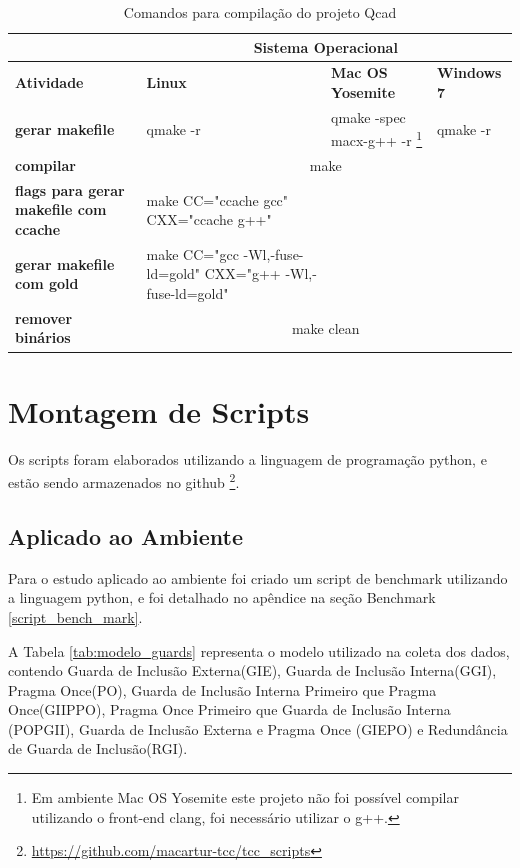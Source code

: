 \begin{itemize}
\begin{table}[h]
\begin{tabular}{p{3cm}p{5cm}p{5cm}p{5cm}}
\toprule
 & \multicolumn{3}{c}{Sistema Operacional} \\ \toprule 
\textbf{Atividade} & \textbf{Linux} & \textbf{Mac OS Yosemite} & \textbf{Windows 7}  \\ \midrule 
\textbf{gerar makefile} & qmake -r & qmake -spec macx-g++ -r  
\footnote{Em ambiente Mac OS Yosemite este projeto não foi possível compilar
 utilizando o front-end clang, foi necessário utilizar o g++.} &  qmake -r  \\ \midrule
\textbf{compilar} & \multicolumn{3}{c}{make } \\ \midrule
\textbf{flags para gerar makefile com ccache} &  make CC="ccache gcc" CXX="ccache g++" \\ \midrule
\textbf{gerar makefile com gold} & make  CC="gcc -Wl,-fuse-ld=gold" CXX="g++ -Wl,-fuse-ld=gold" \\ \midrule
\textbf{remover binários} & \multicolumn{3}{c}{make clean} \\ \bottomrule
\end{tabular} 
\caption{Comandos para compilação do projeto Qcad}
\label{t_compilacao_qcad}
\end{table}

\end{itemize}


\section{Montagem de Scripts}


Os scripts foram elaborados utilizando a linguagem de programação python,
 e estão sendo armazenados no github
\footnote{\url{https://github.com/macartur-tcc/tcc_scripts}}.


\subsection{Aplicado ao Ambiente}\label{Amplicação ao Ambiente}

Para o estudo aplicado ao ambiente foi criado um script de benchmark utilizando
 a linguagem python, e foi detalhado no apêndice na seção Benchmark \ref{script_bench_mark}.

A Tabela \ref{tab:modelo_guards} representa o modelo utilizado na coleta dos dados,
 contendo Guarda de Inclusão Externa(GIE), Guarda de Inclusão Interna(GGI),
 Pragma Once(PO), Guarda de Inclusão Interna Primeiro que Pragma Once(GIIPPO),
 Pragma Once Primeiro que Guarda de Inclusão Interna (POPGII),
 Guarda de Inclusão Externa e Pragma Once (GIEPO) e
 Redundância de Guarda de Inclusão(RGI).

